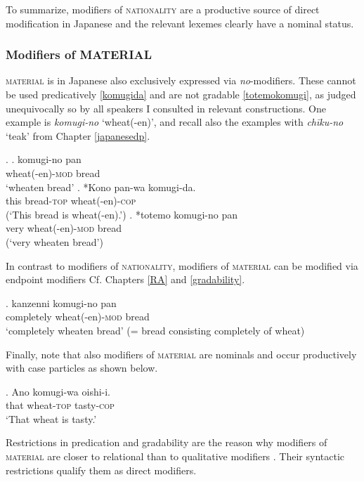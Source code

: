 \documentclass [output=book,colorlinks,citecolor=brown]{langscibook}
\begin{document}
To summarize, modifiers of \textsc{nationality} are a productive source of direct modification in Japanese and the relevant lexemes clearly have a nominal status.

\subsubsection{Modifiers of MATERIAL}

\textsc{material} is in Japanese also exclusively expressed via \textit{no}-modifiers. These cannot be used predicatively \ref{komugida} and are not gradable \ref{totemokomugi}, as judged unequivocally so by all speakers I consulted in relevant constructions. One example is \textit{komugi-no} `wheat(-en)’, and recall also the examples with \textit{chīku-no} `teak’ from Chapter \ref{japanesedp}. %

\newpage

\ex. \ag. komugi-no pan\\
wheat(-en)-\textsc{mod} bread\\
`wheaten bread'
\bg. *Kono pan-wa komugi-da.\\
this bread-\textsc{top} wheat(-en)-\textsc{cop}\\
(`This bread is wheat(-en).’) \label{komugida}
\cg. *totemo komugi-no pan\\
very wheat(-en)-\textsc{mod} bread\\
(`very wheaten bread’) \label{totemokomugi}

In contrast to modifiers of \textsc{nationality}, modifiers of \textsc{material} can be modified via endpoint modifiers \citep{kennedy:2005:scale, fabregas:2014:adjectival, oshima:2019:gradability} Cf. Chapters \ref{RA} and \ref{gradability}.

\exg. kanzenni komugi-no pan\\
completely wheat(-en)-\textsc{mod} bread\\
`completely wheaten bread’ (= bread consisting completely of wheat)

Finally, note that also modifiers of \textsc{material} are nominals and occur productively with case particles as shown below.

\exg. Ano komugi-wa oishi-i.\\
that wheat-\textsc{top} tasty-\textsc{cop}\\
`That wheat is tasty.’

Restrictions in predication and gradability are the reason why modifiers of \textsc{material} are closer to relational than to qualitative modifiers \citep{nagano:2016:are, morita:2011:three}. Their syntactic restrictions qualify them as direct modifiers.
\end{document}
